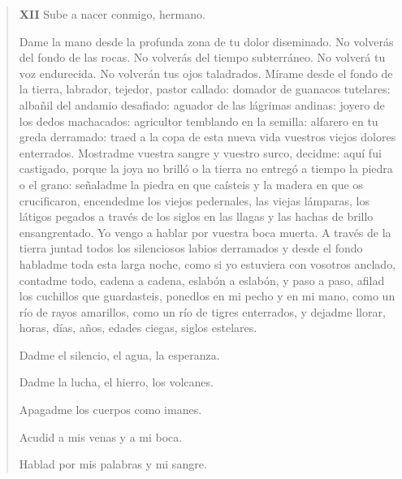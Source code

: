 \documentclass[12pt]{article}
\begin{document}
\begin{verse}
\vspace{\baselineskip}
{\scshape\bfseries XII}
Sube a nacer conmigo, hermano.  
	
Dame la mano desde la profunda  
zona de tu dolor diseminado.  
No volverás del fondo de las rocas.  
No volverás del tiempo subterráneo.  
No volverá tu voz endurecida.  
No volverán tus ojos taladrados.  
Mírame desde el fondo de la tierra,  
labrador, tejedor, pastor callado:  
domador de guanacos tutelares:  
albañil del andamio desafiado:  
aguador de las lágrimas andinas:  
joyero de los dedos machacados:  
agricultor temblando en la semilla:  
alfarero en tu greda derramado:  
traed a la copa de esta nueva vida  
vuestros viejos dolores enterrados.  
Mostradme vuestra sangre y vuestro surco,  
decidme: aquí fui castigado,  
porque la joya no brilló o la tierra  
no entregó a tiempo la piedra o el grano:  
señaladme la piedra en que caísteis  
y la madera en que os crucificaron,  
encendedme los viejos pedernales,  
las viejas lámparas, los látigos pegados  
a través de los siglos en las llagas  
y las hachas de brillo ensangrentado.  
Yo vengo a hablar por vuestra boca muerta.  
A través de la tierra juntad todos  
los silenciosos labios derramados  
y desde el fondo habladme toda esta larga noche,  
como si yo estuviera con vosotros anclado,  
contadme todo, cadena a cadena,  
eslabón a eslabón, y paso a paso,  
afilad los cuchillos que guardasteis,  
ponedlos en mi pecho y en mi mano,  
como un río de rayos amarillos,  
como un río de tigres enterrados,  
y dejadme llorar, horas, días, años,  
edades ciegas, siglos estelares.  
	
Dadme el silencio, el agua, la esperanza.  
	
Dadme la lucha, el hierro, los volcanes.  
	
Apagadme los cuerpos como imanes.  
	
Acudid a mis venas y a mi boca.  
	
Hablad por mis palabras y mi sangre.  

\end{verse}
\end{document}
